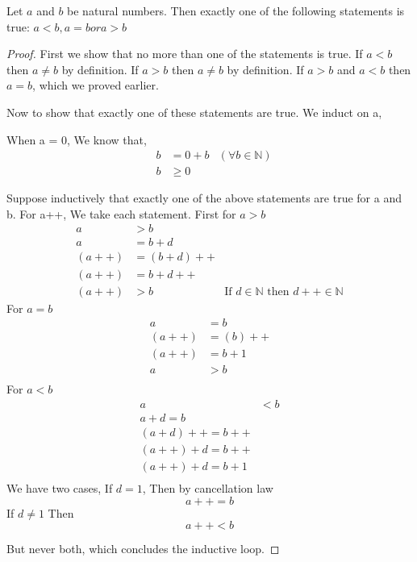 \documentclass[11pt]{report}
\begin{document}
\begin{prop}
Let $a$ and $b$ be natural numbers. Then exactly one of the following statements is true: $a<b, a=b or a>b$
\end{prop}
\begin{proof}
First we show that no more than one of the statements is true.
If $a<b$ then $a \neq b$ by definition. If $a>b$ then $a \neq b$ by definition. If $a>b$ and $a<b$ then $a=b$, which we proved earlier.

Now to show that exactly one of these statements are true.
We induct on a,

When a = 0,
We know that,
\begin{align*}
&b &= 0 + b &(\forall b \in \mathbb{N})\\
&b &\geq 0
\end{align*}

Suppose inductively that exactly one of the above statements are true for a and b.
For a++,
We take each statement. First for $a>b$
\begin{align*}
a &> b \\
a &= b + d \\
(a++) &= (b + d)++ \\
(a++) &= b + d++ \\
(a++) &> b &\text{If $d \in \mathbb{N}$ then $d++ \in \mathbb{N}$}
\end{align*}
For $a=b$
\begin{align*}
a &= b \\
(a++) &= (b)++ \\
(a++) &= b + 1 \\
a &> b \\
\end{align*}
For $a<b$
\begin{align*}
a &<b\\
a + d = b \\
(a + d)++ = b++ \\
(a++) + d = b++ \\
(a++) + d = b + 1 \\
\end{align*}
We have two cases,
If $d = 1$,
Then by cancellation law
$$ a++ = b $$
If $d \neq 1$
Then
$$a++ < b$$

But never both, which concludes the inductive loop.
\end{proof}
\end{document}

